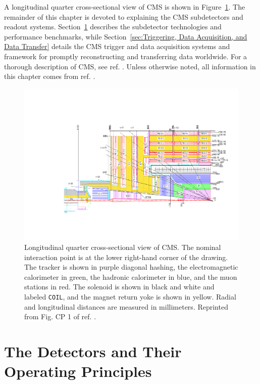 \documentclass[dissertation.tex]{subfiles}
\begin{document}
A longitudinal quarter cross-sectional view of CMS is shown in Figure~\ref{fig:CMS_longitudinal_xsec}.  The remainder of this chapter is devoted to explaining the CMS subdetectors and readout systems.  Section~\ref{sec:The Detectors and Their Operating Principles} describes the subdetector technologies and performance benchmarks, while Section~\ref{sec:Triggering, Data Acquisition, and Data Transfer} details the CMS trigger and data acquisition systems and framework for promptly reconstructing and transferring data worldwide.  For a thorough description of CMS, see ref. \cite{CMS_detector_paper}.  Unless otherwise noted, all information in this chapter comes from ref. \cite{CMS_detector_paper}.

\begin{figure}
	\centering
	\includegraphics[scale=0.5]{CMS_longitudinal_xsec}
	\caption{Longitudinal quarter cross-sectional view of CMS.  The nominal interaction point is at the lower right-hand corner of the drawing.  The tracker is shown in purple diagonal hashing, the electromagnetic calorimeter in green, the hadronic calorimeter in blue, and the muon stations in red.  The solenoid is shown in black and white and labeled \texttt{COIL}, and the magnet return yoke is shown in yellow.  Radial and longitudinal distances are measured in millimeters.  Reprinted from Fig. CP 1 of ref. \cite{CMS_TDR}.}
	\label{fig:CMS_longitudinal_xsec}
\end{figure}

\section{The Detectors and Their Operating Principles}
\label{sec:The Detectors and Their Operating Principles}
\end{document}
